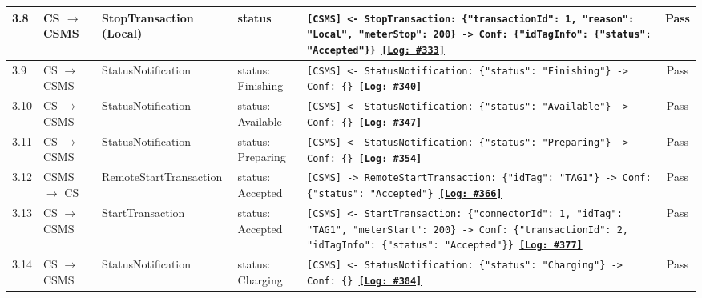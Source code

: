 \documentclass[10pt, a4paper, landscape]{article}
\begin{document}
\begin{longtable}{|p{1.0cm}|p{2.5cm}|p{4.0cm}|p{5.0cm}|p{10.0cm}|c|}
\hline
3.8 & CS $\to$ CSMS & StopTransaction (Local) & status & \footnotesize\texttt{[CSMS] <- StopTransaction: \{"transactionId": 1, "reason": "Local", "meterStop": 200\} \newline [CSMS] -> Conf: \{"idTagInfo": \{"status": "Accepted"\}\} \newline \hyperref[log:3.8]{\textbf{[Log: \#333]}}} & Pass \\
\hline
3.9 & CS $\to$ CSMS & StatusNotification & status: Finishing & \footnotesize\texttt{[CSMS] <- StatusNotification: \{"status": "Finishing"\} \newline [CSMS] -> Conf: \{\} \newline \hyperref[log:3.9]{\textbf{[Log: \#340]}}} & Pass \\
\hline
3.10 & CS $\to$ CSMS & StatusNotification & status: Available & \footnotesize\texttt{[CSMS] <- StatusNotification: \{"status": "Available"\} \newline [CSMS] -> Conf: \{\} \newline \hyperref[log:3.10]{\textbf{[Log: \#347]}}} & Pass \\
\hline
3.11 & CS $\to$ CSMS & StatusNotification & status: Preparing & \footnotesize\texttt{[CSMS] <- StatusNotification: \{"status": "Preparing"\} \newline [CSMS] -> Conf: \{\} \newline \hyperref[log:3.11]{\textbf{[Log: \#354]}}} & Pass \\
\hline
3.12 & CSMS $\to$ CS & RemoteStartTransaction & status: Accepted & \footnotesize\texttt{[CSMS] -> RemoteStartTransaction: \{"idTag": "TAG1"\} \newline [CS] -> Conf: \{"status": "Accepted"\} \newline \hyperref[log:3.12]{\textbf{[Log: \#366]}}} & Pass \\
\hline
3.13 & CS $\to$ CSMS & StartTransaction & status: Accepted & \footnotesize\texttt{[CSMS] <- StartTransaction: \{"connectorId": 1, "idTag": "TAG1", "meterStart": 200\} \newline [CSMS] -> Conf: \{"transactionId": 2, "idTagInfo": \{"status": "Accepted"\}\} \newline \hyperref[log:3.13]{\textbf{[Log: \#377]}}} & Pass \\
\hline
3.14 & CS $\to$ CSMS & StatusNotification & status: Charging & \footnotesize\texttt{[CSMS] <- StatusNotification: \{"status": "Charging"\} \newline [CSMS] -> Conf: \{\} \newline \hyperref[log:3.14]{\textbf{[Log: \#384]}}} & Pass \\

\end{longtable}
\end{document}
